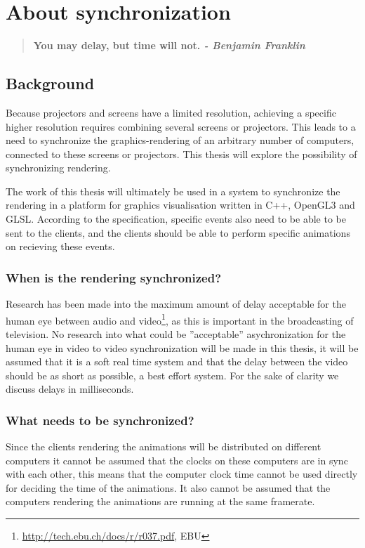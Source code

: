 \chapter{About synchronization}

\begin{quotation}
\bf You may delay, but time will not.
\rm \center \em - Benjamin Franklin
\end{quotation}

\section{Background}

Because projectors and screens have a limited resolution, achieving a specific higher resolution requires combining several screens or projectors. This leads to a need to synchronize the graphics-rendering of an arbitrary number of computers, connected to these screens or projectors. This thesis will explore the possibility of synchronizing rendering.

The work of this thesis will ultimately be used in a system to synchronize the rendering in a platform for graphics visualisation written in C++, OpenGL3 and GLSL. According to the specification, specific events also need to be able to be sent to the clients, and the clients should be able to perform specific animations on recieving these events.  

\subsection{When is the rendering synchronized?}

Research has been made into the maximum amount of delay acceptable for the human eye between audio and video\footnote{\url{http://tech.ebu.ch/docs/r/r037.pdf}, EBU}, as this is important in the broadcasting of television. No research into what could be ''acceptable'' asychronization for the human eye in video to video synchronization will be made in this thesis, it will be assumed that it is a soft real time system and that the delay between the video should be as short as possible, a best effort system. For the sake of clarity we discuss delays in milliseconds.

\subsection{What needs to be synchronized?}

Since the clients rendering the animations will be distributed on different computers it cannot be assumed that the clocks on these computers are in sync with each other, this means that the computer clock time cannot be used directly for deciding the time of the animations. It also cannot be assumed that the computers rendering the animations are running at the same framerate. 

